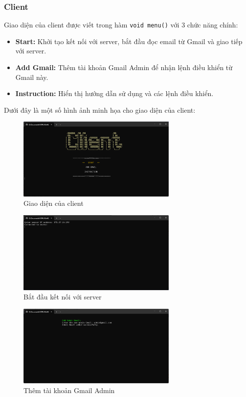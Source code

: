 \subsubsection{Client}

Giao diện của client được viết trong hàm \texttt{void menu()} với 3 chức năng chính:
\begin{itemize}
    \item \textbf{Start:} Khởi tạo kết nối với server, bắt đầu đọc email từ Gmail và giao tiếp với server.
    \item \textbf{Add Gmail:} Thêm tài khoản Gmail Admin để nhận lệnh điều khiển từ Gmail này.
    \item \textbf{Instruction:} Hiển thị hướng dẫn sử dụng và các lệnh điều khiển.
\end{itemize}

Dưới đây là một số hình ảnh minh họa cho giao diện của client:
\begin{figure}[H]
    \centering
    \includegraphics[width=0.7\textwidth]{img/client.png}
    \caption{Giao diện của client}
\end{figure}

\begin{figure}
    \centering
    \includegraphics[width=0.7\textwidth]{img/start.png}
    \caption{Bắt đầu kết nối với server}
\end{figure}

\begin{figure}[H]
    \centering
    \includegraphics[width=0.7\textwidth]{img/add_gmail.png}
    \caption{Thêm tài khoản Gmail Admin}
\end{figure}

